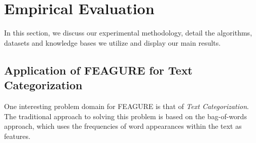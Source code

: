 \documentclass{article}
\theoremstyle{definition}
\begin{document}
	
	
		
		


\section{Empirical Evaluation}
In this section, we discuss our experimental methodology, detail the algorithms, datasets and knowledge bases we utilize and display our main results.

\subsection{Application of FEAGURE for Text Categorization} \label{text-feagure}

One interesting problem domain for FEAGURE is that of \emph{Text Categorization}.
The traditional approach to solving this problem is based on the bag-of-words \citep{Wu:1981:CST:1013228.511759} approach, which uses the frequencies of word appearances within the text as features. 
\end{document}
